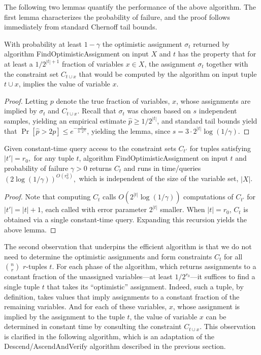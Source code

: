 \documentclass[anon,12pt]{colt2018}
\begin{document}
The following two lemmas quantify the performance of the above algorithm.  The first lemma characterizes the probability of failure, and the proof follows immediately from standard Chernoff tail bounds.
\begin{lemma}
With probability at least $1-\gamma$  the optimistic assignment $\sigma_t$ returned by  algorithm FindOptimisticAssignment on input $X$ and $t$ has the property that for at least a $1/2^{|t|+1}$ fraction of variables $x \in X$, the assignment $\sigma_t$ together with the constraint set $C_{t \cup x}$ that would be computed by the algorithm on input tuple $t \cup x$, implies the value of variable $x$.  
\end{lemma}
\begin{proof}
Letting $p$ denote the true fraction of variables, $x$, whose assignments are implied by $\sigma_t$ and $C_{t \cup x}$.  Recall that $\sigma_t$ was chosen based on $s$ independent samples, yielding an empirical estimate $\hat{p} \ge 1/2^{|t|}$, and standard tail bounds yield that $\Pr[\hat{p} > 2p] \le e^{-\frac{s}{3\cdot 2^{|t|}}}$, yielding the lemma, since $s=3\cdot 2^{|t|} \log (1/\gamma)$.
\end{proof}

\begin{lemma}
Given constant-time query access to the constraint sets $C_{t'}$ for tuples satisfying $|t'|=r_0,$ for any tuple $t$, algorithm FindOptimisticAssignment on input $t$ and probability of failure $\gamma>0$ returns $C_t$ and runs in time/queries $\left(2\log(1/\gamma)\right)^{O(r_0^2)},$ which is independent of the size of the variable set, $|X|$.
\end{lemma}
\begin{proof}
Note that computing $C_t$ calls $O(2^{|t|} \log (1/\gamma))$ computations of $C_{t'}$ for $|t'| = |t|+1$, each called with error parameter $2^{|t|}$ smaller.  When $|t|=r_0$, $C_t$ is obtained via a single constant-time query.  Expanding this recursion yields the above lemma.
\end{proof}

The second observation that underpins the efficient algorithm is that we do not need to determine the optimistic assignments and form constraints $C_t$ for all ${n \choose r}$ $r$-tuples $t$.  For each phase of the algorithm, which returns assignments to a constant fraction of the unassigned variables---at least $1/2^{r_0}$---it suffices to find a single tuple $t$ that takes its ``optimistic'' assignment.  Indeed, such a tuple, by definition, takes values that imply assignments to a constant fraction of the remaining variables.  And for each of these variables, $x$, whose assignment is implied by the assignment to the tuple $t$, the value of variable $x$ can be determined in constant time by consulting the constraint $C_{t \cup x}.$  This observation is clarified in the following algorithm, which is an adaptation of the Descend/AscendAndVerify algorithm described in the previous section.   
\end{document}

